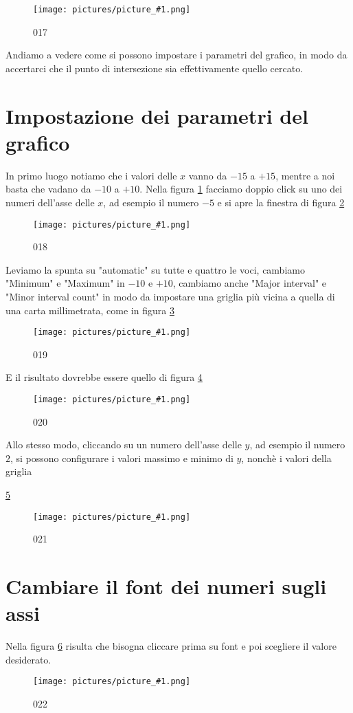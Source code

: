 \documentclass[17pt]{extarticle}
\newcommand{\pict}[1]{
\begin{figure}[h!]		
	\centering
   	\texttt{[image: pictures/picture\_\#1.png]}
  	\caption{#1}
   	\label{fig:LibreOfficeCalc#1}
\end{figure}
}
\begin{document}
%
\pict{017}


Andiamo a vedere come si possono impostare i parametri del grafico, in modo da accertarci che il punto di intersezione sia effettivamente quello cercato.




\section{Impostazione dei parametri del grafico}

In primo luogo notiamo che i valori delle $x$ vanno da $-15$ a $+15$, mentre a noi basta che vadano da $-10$ a $+10$. Nella figura \ref{fig:LibreOfficeCalc017} facciamo doppio click su uno dei numeri dell'asse delle $x$, ad esempio il numero $-5$ e si apre la finestra di figura \ref{fig:LibreOfficeCalc018}

%
\pict{018}

Leviamo la spunta su "automatic" su tutte e quattro le voci, cambiamo "Minimum" e "Maximum" in $-10$ e $+10$, cambiamo anche "Major interval" e "Minor interval count" in modo da impostare una griglia più vicina a quella di una carta millimetrata, come in figura \ref{fig:LibreOfficeCalc019}


%
\pict{019}

E il risultato dovrebbe essere quello di figura \ref{fig:LibreOfficeCalc020}

%
\pict{020}

Allo stesso modo, cliccando su un numero dell'asse delle $y$, ad esempio il numero $2$, si possono configurare i valori massimo e minimo di $y$, nonchè i valori della griglia

\ref{fig:LibreOfficeCalc021}


%
\pict{021}





\section{Cambiare il font dei numeri sugli assi}

Nella figura \ref{fig:LibreOfficeCalc022} risulta che bisogna cliccare prima su font e poi scegliere il valore desiderato.
%
\pict{022}
\end{document}
